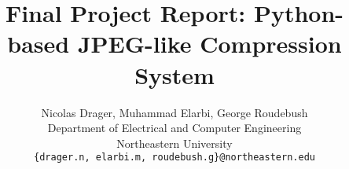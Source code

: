 \documentclass[10pt,twocolumn,letterpaper]{article}
\title{Final Project Report: Python-based JPEG-like Compression System}
\author{
Nicolas Drager, Muhammad Elarbi, George Roudebush\\
Department of Electrical and Computer Engineering\\
Northeastern University\\
\texttt{\{drager.n, elarbi.m, roudebush.g\}@northeastern.edu}
}
\begin{document}
\maketitle
    




{
    \small
    
    
}

% 
\end{document}

